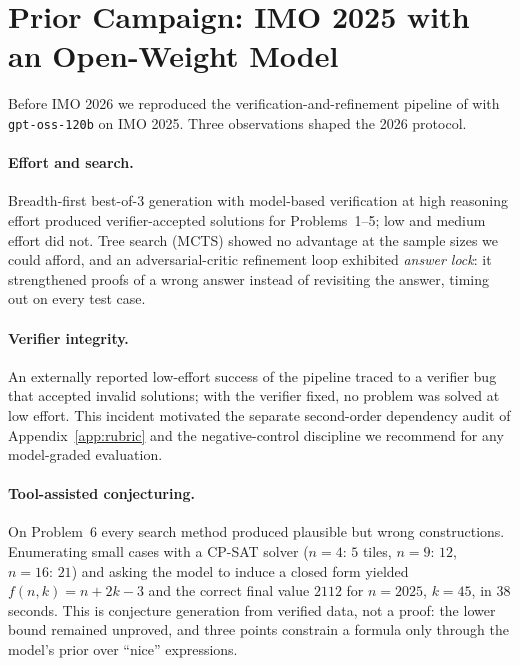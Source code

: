 \makeatletter
{}
\providecommand{\CRsec}[2]{\@ifundefined{r@#1}{#2}{\S\ref{#1}}}
\providecommand{\CRtab}[2]{\@ifundefined{r@#1}{#2}{Table~\ref{#1}}}
\providecommand{\CRfig}[2]{\@ifundefined{r@#1}{#2}{Figure~\ref{#1}}}
\newsavebox{\CRappfitbox}
\providecommand{\CRfit}[1]{\sbox{\CRappfitbox}{#1}\ifdim\wd\CRappfitbox>\linewidth\resizebox{\linewidth}{!}{\usebox{\CRappfitbox}}\else\usebox{\CRappfitbox}\fi}
\makeatother

\appendix

\section{Prior Campaign: IMO 2025 with an Open-Weight Model}
\label{app:imo25}

Before IMO 2026 we reproduced the verification-and-refinement pipeline of \citet{huang2025gold} with \texttt{gpt-oss-120b} \citep{openai2025gptoss} on IMO 2025. Three observations shaped the 2026 protocol.

\paragraph{Effort and search.} Breadth-first best-of-3 generation with model-based verification at high reasoning effort produced verifier-accepted solutions for Problems~1--5; low and medium effort did not. Tree search (MCTS) showed no advantage at the sample sizes we could afford, and an adversarial-critic refinement loop exhibited \emph{answer lock}: it strengthened proofs of a wrong answer instead of revisiting the answer, timing out on every test case.

\paragraph{Verifier integrity.} An externally reported low-effort success of the pipeline traced to a verifier bug that accepted invalid solutions; with the verifier fixed, no problem was solved at low effort. This incident motivated the separate second-order dependency audit of Appendix~\ref{app:rubric} and the negative-control discipline we recommend for any model-graded evaluation.

\paragraph{Tool-assisted conjecturing.} On Problem~6 every search method produced plausible but wrong constructions. Enumerating small cases with a CP-SAT solver \citep{perron2023cpsat} ($n=4{:}\,5$ tiles, $n=9{:}\,12$, $n=16{:}\,21$) and asking the model to induce a closed form yielded $f(n,k)=n+2k-3$ and the correct final value $2112$ for $n=2025$, $k=45$, in 38 seconds. This is conjecture generation from verified data, not a proof: the lower bound remained unproved, and three points constrain a formula only through the model's prior over ``nice'' expressions.

